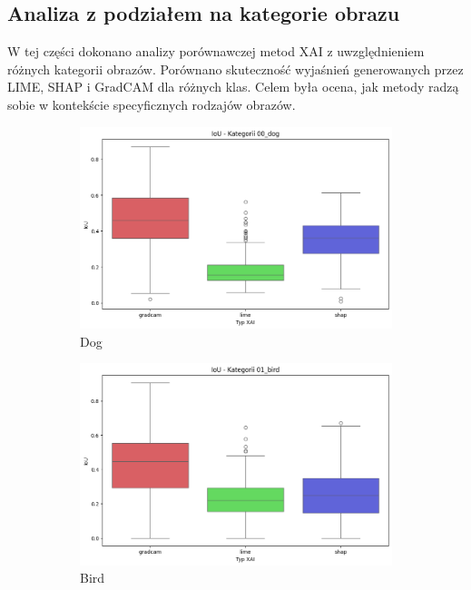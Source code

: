 \subsection*{Analiza z podziałem na kategorie obrazu}

W tej części dokonano analizy porównawczej metod XAI z uwzględnieniem różnych kategorii obrazów.
Porównano skuteczność wyjaśnień generowanych przez LIME, SHAP i GradCAM dla różnych klas.
Celem była ocena, jak metody radzą sobie w kontekście specyficznych rodzajów obrazów.

\begin{figure}[h]
	\centering
	\begin{subfigure}[b]{0.3\textwidth}
		\includegraphics[width=.9\textwidth]{img/base_iou_dog}
		\caption{Dog}
	\end{subfigure}
	\begin{subfigure}[b]{0.3\textwidth}
		\centering\includegraphics[width=.9\textwidth]{img/base_iou_bird}
		\caption{Bird}
	\end{subfigure}
	\begin{subfigure}[b]{0.3\textwidth}

\end{subfigure}
\end{figure}
